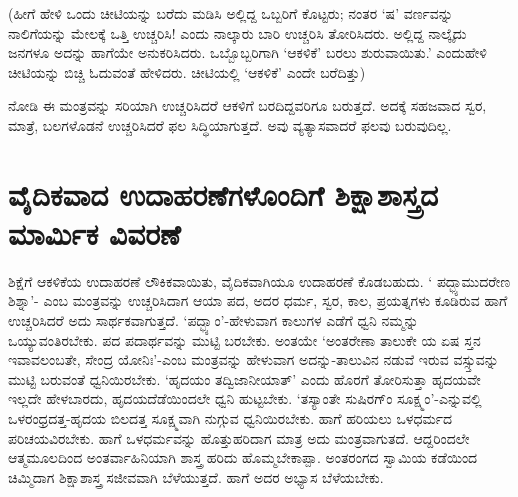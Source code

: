 (ಹೀಗೆ ಹೇಳಿ ಒಂದು ಚೀಟಿಯನ್ನು ಬರೆದು ಮಡಿಸಿ ಅಲ್ಲಿದ್ದ ಒಬ್ಬರಿಗೆ ಕೊಟ್ಟರು; ನಂತರ `ಷ' ವರ್ಣವನ್ನು ನಾಲಿಗೆಯನ್ನು ಮೇಲಕ್ಕೆ  ಒತ್ತಿ ಉಚ್ಚರಿಸಿ! ಎಂದು ನಾಲ್ಕಾರು ಬಾರಿ ಉಚ್ಚರಿಸಿ ತೋರಿಸಿದರು. ಅಲ್ಲಿದ್ದ ನಾಲ್ಕೈದು ಜನಗಳೂ ಅದನ್ನು ಹಾಗೆಯೇ ಅನುಕರಿಸಿದರು. ಒಬ್ಬೊಬ್ಬರಿಗಾಗಿ `ಆಕಳಿಕೆ' ಬರಲು ಶುರುವಾಯಿತು.' ಎಂದುಹೇಳಿ ಚೀಟಿಯನ್ನು ಬಿಚ್ಚಿ ಓದುವಂತೆ ಹೇಳಿದರು. ಚೀಟಿಯಲ್ಲಿ `ಆಕಳಿಕೆ' ಎಂದೇ ಬರೆದಿತ್ತು)

ನೋಡಿ ಈ ಮಂತ್ರವನ್ನು ಸರಿಯಾಗಿ ಉಚ್ಚರಿಸಿದರೆ ಆಕಳಿಗೆ ಬರದಿದ್ದವರಿಗೂ ಬರುತ್ತದೆ. ಅದಕ್ಕೆ ಸಹಜವಾದ ಸ್ವರ, ಮಾತ್ರೆ, ಬಲಗಳೊಡನೆ ಉಚ್ಚರಿಸಿದರೆ ಫಲ ಸಿದ್ಧಿಯಾಗುತ್ತದೆ. ಅವು ವ್ಯತ್ಯಾಸವಾದರೆ ಫಲವು ಬರುವುದಿಲ್ಲ.

\section*{ವೈದಿಕವಾದ ಉದಾಹರಣೆಗಳೊಂದಿಗೆ ಶಿಕ್ಷಾಶಾಸ್ತ್ರದ ಮಾರ್ಮಿಕ ವಿವರಣೆ}

ಶಿಕ್ಷೆಗೆ ಆಕಳಿಕೆಯ ಉದಾಹರಣೆ ಲೌಕಿಕವಾಯಿತು, ವೈದಿಕವಾಗಿಯೂ ಉದಾಹರಣೆ ಕೊಡಬಹುದು. ` ಪದ್ಭ್ಯಾಮುದರೇಣ ಶಿಶ್ನಾ'-\label{26} ಎಂಬ ಮಂತ್ರವನ್ನು ಉಚ್ಚರಿಸಿದಾಗ ಆಯಾ ಪದ, ಅದರ ಧರ್ಮ, ಸ್ವರ, ಕಾಲ, ಪ್ರಯತ್ನಗಳು ಕೂಡಿರುವ ಹಾಗೆ ಉಚ್ಚರಿಸಿದರೆ ಅದು ಸಾರ್ಥಕವಾಗುತ್ತದೆ. `ಪದ್ಭ್ಯಾಂ'-ಹೇಳುವಾಗ ಕಾಲುಗಳ ಎಡೆಗೆ ಧ್ವನಿ ನಮ್ಮನ್ನು ಒಯ್ಯುವಂತಿರಬೇಕು. ಪದ ಪದಾರ್ಥವನ್ನು ಮುಟ್ಟಿ ಬರಬೇಕು. ಅಂತಯೇ `ಅಂತರೇಣಾ ತಾಲುಕೇ ಯ ಏಷ ಸ್ತನ ಇವಾವಲಂಬತೇ, ಸೇಂದ್ರ ಯೋನಿಃ'-ಎಂಬ ಮಂತ್ರವನ್ನು ಹೇಳುವಾಗ ಅದನ್ನು-ತಾಲುವಿನ ನಡುವೆ ಇರುವ ವಸ್ಸ್ತುವನ್ನು ಮುಟ್ಟಿ ಬರುವಂತೆ ಧ್ವನಿಯಿರಬೇಕು. `ಹೃದಯಂ ತದ್ವಿಜಾನೀಯಾತ್' ಎಂದು ಹೊರಗೆ ತೋರಿಸುತ್ತಾ ಹೃದಯವೇ ಇಲ್ಲದೇ ಹೇಳಬಾರದು, ಹೃದಯದೆಡೆಯಿಂದಲೇ ಧ್ವನಿ ಹುಟ್ಟಬೇಕು. `ತಸ್ಯಾಂತೇ ಸುಷಿರಗ್ಂ ಸೂಕ್ಷ್ಮಂ'-ಎನ್ನುವಲ್ಲಿ\label{27} ಒಳರಂಧ್ರದತ್ತ-ಹೃದಯ ಬಿಲದತ್ತ ಸೂಕ್ಷ್ಮವಾಗಿ ನುಗ್ಗುವ ಧ್ವನಿಯಿರಬೇಕು. ಹಾಗೆ ಹರಿಯಲು ಒಳಧರ್ಮದ ಪರಿಚಯವಿರಬೇಕು. ಹಾಗೆ ಒಳಧರ್ಮವನ್ನು ಹೊತ್ತುಹರಿದಾಗ ಮಾತ್ರ ಅದು ಮಂತ್ರವಾಗುತದೆ. ಆದ್ದರಿಂದಲೇ ಆತ್ಮಮೂಲದಿಂದ ಅಂತರ್ವಾಹಿನಿಯಾಗಿ ಶಾಸ್ತ್ರ ಹರಿದು ಹೊಮ್ಮಬೇಕಾಪ್ಪಾ. ಅಂತರಂಗದ ಸ್ವಾಮಿಯ ಕಡೆಯಿಂದ ಚಿಮ್ಮಿದಾಗ ಶಿಕ್ಷಾಶಾಸ್ತ್ರ ಸಜೀವವಾಗಿ ಬೆಳೆಯುತ್ತದೆ. ಹಾಗೆ ಅದರ ಅಭ್ಯಾಸ ಬೆಳೆಯಬೇಕು.



